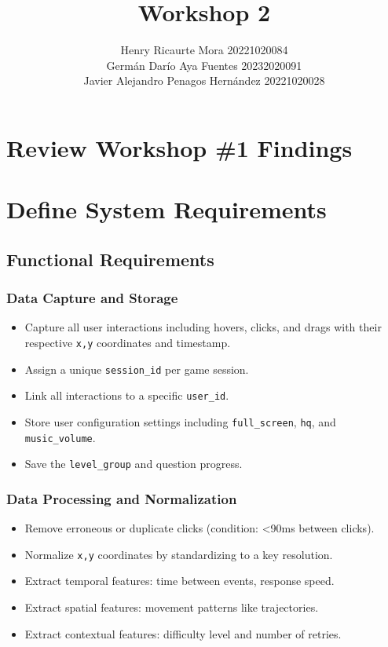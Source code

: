 \documentclass{article}
\title{Workshop 2}
\author{
Henry Ricaurte Mora 20221020084 \\
Germán Darío Aya Fuentes 20232020091 \\
Javier Alejandro Penagos Hernández 20221020028
}
\date{}
\newcommand{\reqnum}[1]{\textbf{\underline{RF-#1}}}
\begin{document}
\maketitle

\section{Review Workshop {\#}1 Findings}

\section{Define System Requirements}

\subsection{Functional Requirements}

\subsubsection{Data Capture and Storage}
\begin{itemize}
    \item[\reqnum{001}] Capture all user interactions including hovers, clicks, and drags with their respective \texttt{x,y} coordinates and timestamp.
    \item[\reqnum{002}] Assign a unique \texttt{session\_id} per game session.
    \item[\reqnum{003}] Link all interactions to a specific \texttt{user\_id}.
    \item[\reqnum{004}] Store user configuration settings including \texttt{full\_screen}, \texttt{hq}, and \texttt{music\_volume}.
    \item[\reqnum{005}] Save the \texttt{level\_group} and question progress.
\end{itemize}

\subsubsection{Data Processing and Normalization}
\begin{itemize}
    \item[\reqnum{006}] Remove erroneous or duplicate clicks (condition: <90ms between clicks).
    \item[\reqnum{007}] Normalize \texttt{x,y} coordinates by standardizing to a key resolution.
    \item[\reqnum{008}] Extract temporal features: time between events, response speed.
    \item[\reqnum{009}] Extract spatial features: movement patterns like trajectories.
    \item[\reqnum{010}] Extract contextual features: difficulty level and number of retries.
\end{itemize}
\end{document}

